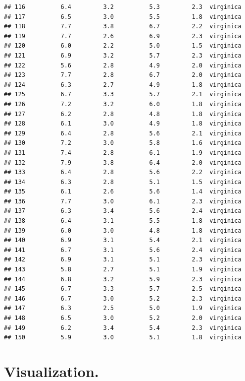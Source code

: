 \documentclass[
]{book}
\begin{document}
\begin{verbatim}
## 116          6.4         3.2          5.3         2.3  virginica
## 117          6.5         3.0          5.5         1.8  virginica
## 118          7.7         3.8          6.7         2.2  virginica
## 119          7.7         2.6          6.9         2.3  virginica
## 120          6.0         2.2          5.0         1.5  virginica
## 121          6.9         3.2          5.7         2.3  virginica
## 122          5.6         2.8          4.9         2.0  virginica
## 123          7.7         2.8          6.7         2.0  virginica
## 124          6.3         2.7          4.9         1.8  virginica
## 125          6.7         3.3          5.7         2.1  virginica
## 126          7.2         3.2          6.0         1.8  virginica
## 127          6.2         2.8          4.8         1.8  virginica
## 128          6.1         3.0          4.9         1.8  virginica
## 129          6.4         2.8          5.6         2.1  virginica
## 130          7.2         3.0          5.8         1.6  virginica
## 131          7.4         2.8          6.1         1.9  virginica
## 132          7.9         3.8          6.4         2.0  virginica
## 133          6.4         2.8          5.6         2.2  virginica
## 134          6.3         2.8          5.1         1.5  virginica
## 135          6.1         2.6          5.6         1.4  virginica
## 136          7.7         3.0          6.1         2.3  virginica
## 137          6.3         3.4          5.6         2.4  virginica
## 138          6.4         3.1          5.5         1.8  virginica
## 139          6.0         3.0          4.8         1.8  virginica
## 140          6.9         3.1          5.4         2.1  virginica
## 141          6.7         3.1          5.6         2.4  virginica
## 142          6.9         3.1          5.1         2.3  virginica
## 143          5.8         2.7          5.1         1.9  virginica
## 144          6.8         3.2          5.9         2.3  virginica
## 145          6.7         3.3          5.7         2.5  virginica
## 146          6.7         3.0          5.2         2.3  virginica
## 147          6.3         2.5          5.0         1.9  virginica
## 148          6.5         3.0          5.2         2.0  virginica
## 149          6.2         3.4          5.4         2.3  virginica
## 150          5.9         3.0          5.1         1.8  virginica
\end{verbatim}

\hypertarget{visualization.}{%
\chapter{Visualization.}\label{visualization.}}
\end{document}
